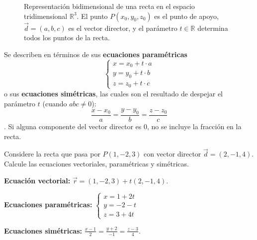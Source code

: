 \begin{definition}
\begin{figure}[H]
\caption{Representación bidimensional de una recta en el espacio tridimensional $\mathbb{R}^3$. El punto $P(x_0,y_0,z_0)$ es el punto de apoyo, $\vec{d}=(a,b,c)$ es el vector director, y el parámetro $t \in \mathbb{R}$ determina todos los puntos de la recta.}
\label{fig:rectaespacio}
\end{figure}

Se describen en términos de sus \textbf{ecuaciones paramétricas} \[
\begin{cases}
x = x_0 + t \cdot a \\
y = y_0 + t \cdot b \\
z = z_0 + t \cdot c
\end{cases}
\] o sus \textbf{ecuaciones simétricas}, las cuales son el resultado de despejar el parámetro $t$ (cuando $abc \neq 0$):
\[\frac{x - x_0}{a} = \frac{y - y_0}{b} = \frac{z - z_0}{c}\]. Si alguna componente del vector director es 0, no se incluye la fracción en la recta.
\end{definition}

\begin{example}
Considere la recta que pasa por $P(1, -2, 3)$ con vector director $\vec{d} = (2, -1, 4).$ Calcule las ecuaciones vectoriales, paramétricas y simétricas. 
\begin{myproof}
\textbf{Ecuación vectorial:} \(\vec{r} = (1, -2, 3) + t(2, -1, 4)\).

\textbf{Ecuaciones paramétricas:} \(
\begin{cases}
x = 1 + 2t \\
y = -2 - t \\
z = 3 + 4t
\end{cases}
\)

\textbf{Ecuaciones simétricas:} \( \frac{x - 1}{2} = \frac{y + 2}{-1} = \frac{z - 3}{4}
\).  
\end{myproof}


\end{example}



